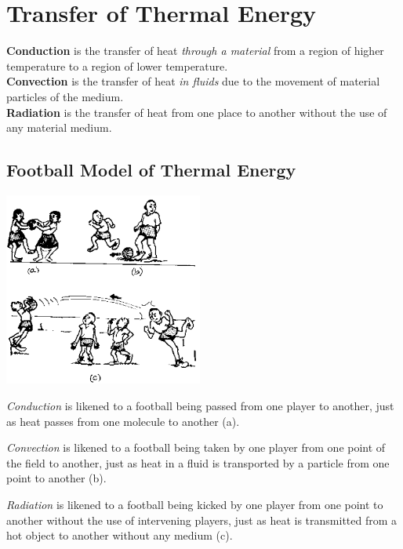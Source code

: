 \section{Transfer of Thermal Energy}

\textbf{Conduction} is the transfer of heat \emph{through a material} from a region of higher temperature to a region of lower temperature.\\
\textbf{Convection} is the transfer of heat \emph{in fluids} due to the movement of material particles of the medium.\\
\textbf{Radiation} is the transfer of heat from one place to another without the use of any material medium.

\begin{multicols}{2}


\subsection{Football Model of Thermal Energy}

\begin{center}
\includegraphics[width=0.49\textwidth]{./img/source/football-thermal.png}
\end{center}

\emph{Conduction} is likened to a football being passed from one player to another, just as heat passes from one molecule to another (a).

\emph{Convection} is likened to a football being taken by one player from one point of the field to another, just as heat in a fluid is transported by a particle from one point to another (b).

\emph{Radiation} is likened to a football being kicked by one player from one point to another without the use of intervening players, just as heat is transmitted from a hot object to another without any medium (c).

\vfill
\columnbreak


\end{multicols}
